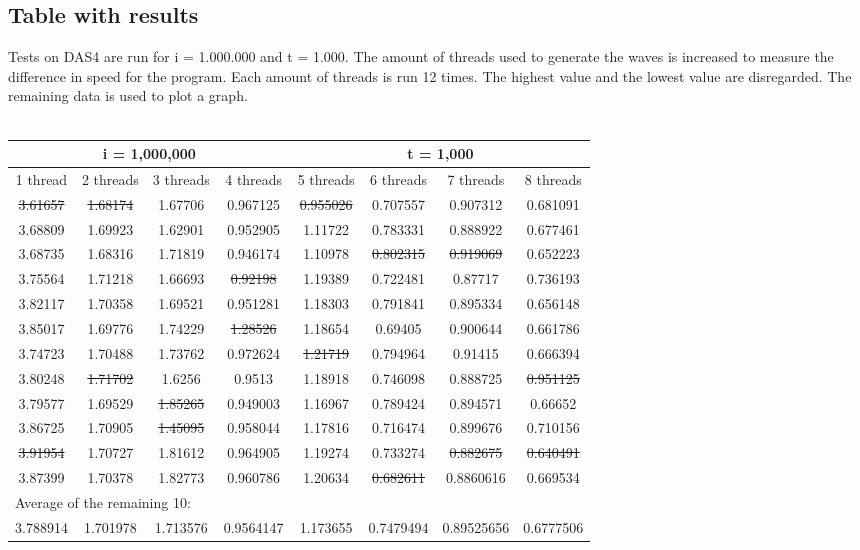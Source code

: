 \documentclass[a4paper]{article}
\begin{document}
  \subsection{Table with results}
    Tests on DAS4 are run for i = 1.000.000 and t = 1.000.
    The amount of threads used to generate the waves is increased to measure the
    difference in speed for the program.
    Each amount of threads is run 12 times. 
    The highest value and the lowest value are disregarded. 
    The remaining data is used to plot a graph.\\\\
    \begin{tabular}{| c | c | c | c | c | c | c | c |}
      \hline
      \multicolumn{4}{|c}{i = 1,000,000} & \multicolumn{4}{c|}{t = 1,000}\\
      \hline
      1 thread & 2 threads & 3 threads & 4 threads & 5 threads & 6 threads & 7 threads & 8 threads\\
      \hline
      \st{3.61657} & \st{1.68174} & 1.67706 & 0.967125 & \st{0.955026} & 0.707557 & 0.907312 & 0.681091\\
      \hline
      3.68809 & 1.69923 & 1.62901 & 0.952905 & 1.11722 & 0.783331 & 0.888922 & 0.677461\\
      \hline
      3.68735 & 1.68316 & 1.71819 & 0.946174 & 1.10978 & \st{0.802315} & \st{0.919069} & 0.652223\\
      \hline
      3.75564 & 1.71218 & 1.66693 & \st{0.92198} & 1.19389 & 0.722481 & 0.87717 & 0.736193\\
      \hline
      3.82117 & 1.70358 & 1.69521 & 0.951281 & 1.18303 & 0.791841 & 0.895334 & 0.656148\\
      \hline
      3.85017 & 1.69776 & 1.74229 & \st{1.28526} & 1.18654 & 0.69405 & 0.900644 & 0.661786\\
      \hline
      3.74723 & 1.70488 & 1.73762 & 0.972624 & \st{1.21719} & 0.794964 & 0.91415 & 0.666394\\
      \hline
      3.80248 & \st{1.71702} & 1.6256 & 0.9513 & 1.18918 & 0.746098 & 0.888725 & \st{0.951125}\\
      \hline
      3.79577 & 1.69529 & \st{1.85265} & 0.949003 & 1.16967 & 0.789424 & 0.894571 & 0.66652\\
      \hline
      3.86725 & 1.70905 & \st{1.45095} & 0.958044 & 1.17816 & 0.716474 & 0.899676 & 0.710156\\
      \hline
      \st{3.91954} & 1.70727 & 1.81612 & 0.964905 & 1.19274 & 0.733274 & \st{0.882675} & \st{0.640491}\\
      \hline
      3.87399 & 1.70378 & 1.82773 & 0.960786 & 1.20634 & \st{0.682611} & 0.8860616 & 0.669534\\
      \hline
      \multicolumn{8}{|l|}{Average of the remaining 10:}\\
      \hline
      3.788914 & 1.701978 & 1.713576 & 0.9564147 & 1.173655 & 0.7479494 & 0.89525656 & 0.6777506\\
      \hline
    \end{tabular}
\end{document}
